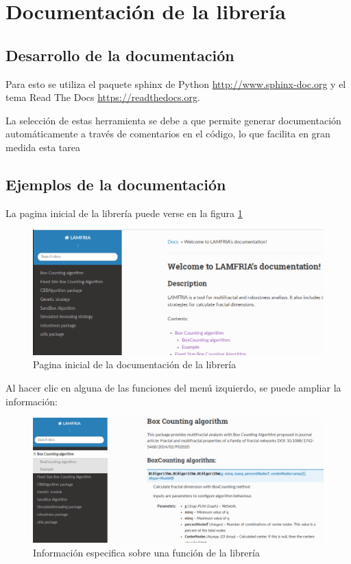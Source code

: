 \section{Documentación de la librería}

\subsection{Desarrollo de la documentación}

Para esto se utiliza el paquete sphinx de Python \url{http://www.sphinx-doc.org} y el tema Read The Docs \url{https://readthedocs.org}.

La selección de estas herramienta se debe a que permite generar documentación automáticamente a través de comentarios en el código, lo que facilita en gran medida esta tarea

\subsection{Ejemplos de la documentación}

La pagina inicial de la librería puede verse en la figura  \ref{fig:lamfriaA}

\begin{figure}[H]
    \centering
    \includegraphics[scale=0.45]{Capitulo7Libreria/imagenes/lamfriaA.png}
    \caption{Pagina inicial de la documentación de la librería}
    \label{fig:lamfriaA}
\end{figure}

Al hacer clic en alguna de las funciones del menú izquierdo, se puede ampliar la información:


\begin{figure}[H]
    \centering
    \includegraphics[scale=0.4]{Capitulo7Libreria/imagenes/lamfriaB.png}
    \caption{Información especifica sobre una función de la librería}
    \label{fig:lamfriaB}
\end{figure}

